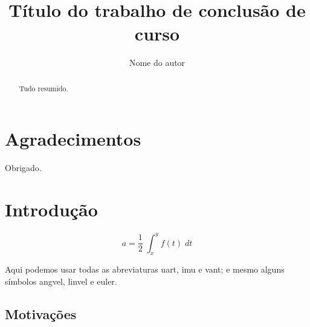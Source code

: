 \documentclass{automatex}
\title{Título do trabalho de conclusão de curso}
\author{Nome do autor}
\begin{document}
\maketitle

\setcounter{page}{1}

\tableofcontents

\section*{Agradecimentos}
Obrigado.
\newpage

\begin{abstract}
  Tudo resumido.
\end{abstract}
\newpage

\listoffigures
\newpage

\listoftables
\newpage

\printglossary[type=\acronymtype,title=Lista de Abreviaturas e Siglas]
\newpage

\printglossary[title=Lista de Simbolos]

\section{Introdução}

\setcounter{page}{1}

\lipsum[1-2]
\begin{equation}
  a = \dfrac{1}{2}\;\int_x^y f(t)\; dt
\end{equation}

Aqui podemos usar todas as abreviaturas \gls{uart}, \gls{imu} e \gls{vant}; e mesmo
alguns símbolos \gls{angvel}, \gls{linvel} e \gls{euler}.

\lipsum[24-26]

\subsection{Motivações}
\end{document}
